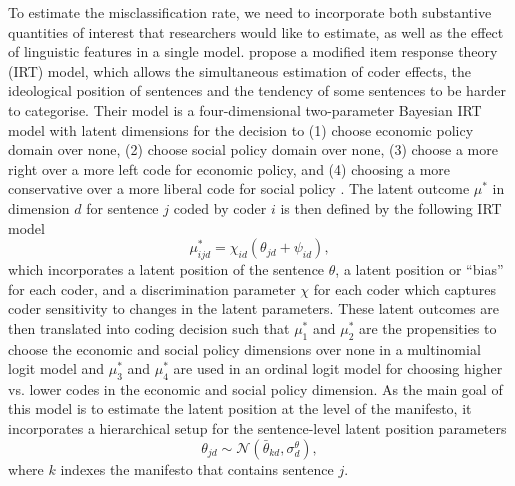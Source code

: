 \documentclass[a4paper, 12pt]{article}
\begin{document}
To estimate the misclassification rate, we need to incorporate both substantive quantities of interest that researchers would like to estimate, as well as the effect of linguistic features in a single model.  propose a modified item response theory (IRT) model, which allows the simultaneous estimation of coder effects, the ideological position of sentences and the tendency of some sentences to be harder to categorise. Their model is a four-dimensional two-parameter Bayesian IRT model with latent dimensions for the decision to (1) choose economic policy domain over none, (2) choose social policy domain over none, (3) choose a more right over a more left code for economic policy, and (4) choosing a more conservative over a more liberal code for social policy \citep[282]{Benoit2016}. The latent outcome $\mu^*$ in dimension $d$ for sentence $j$ coded by coder $i$ is then defined by the following IRT model
\begin{equation*}
  \label{eq:benoitetal}
  \mu^*_{ijd} = \chi_{id} (\theta_{jd} + \psi_{id}),
\end{equation*}
which incorporates a latent position of the sentence $\theta$, a latent position or \enquote{bias} for each coder, and a discrimination parameter $\chi$ for each coder which captures coder sensitivity to changes in the latent parameters. These latent outcomes are then translated into coding decision such that $\mu^*_1$ and $\mu^*_2$ are the propensities to choose the economic and social policy dimensions over none in a multinomial logit model and $\mu^*_3$ and $\mu^*_4$ are used in an ordinal logit model for choosing higher vs. lower codes in the economic and social policy dimension. As the main goal of this model is to estimate the latent position at the level of the manifesto, it incorporates a hierarchical setup for the sentence-level latent position parameters
\begin{equation*}
  \theta_{jd} \sim \mathcal{N}(\bar{\theta}_{kd}, \sigma^{\theta}_{d}),
\end{equation*}
where $k$ indexes the manifesto that contains sentence $j$.
\end{document}
